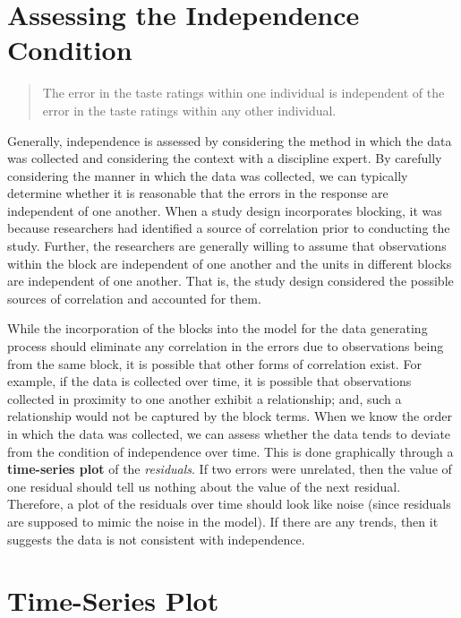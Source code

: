 \documentclass[
  letterpaper,
  DIV=11,
  numbers=noendperiod]{scrreprt}
\theoremstyle{plain}
\theoremstyle{definition}
\theoremstyle{definition}
\theoremstyle{remark}
\begin{document}
\hypertarget{assessing-the-independence-condition-2}{%
\section{Assessing the Independence
Condition}\label{assessing-the-independence-condition-2}}

\begin{quote}
The error in the taste ratings within one individual is independent of
the error in the taste ratings within any other individual.
\end{quote}

Generally, independence is assessed by considering the method in which
the data was collected and considering the context with a discipline
expert. By carefully considering the manner in which the data was
collected, we can typically determine whether it is reasonable that the
errors in the response are independent of one another. When a study
design incorporates blocking, it was because researchers had identified
a source of correlation prior to conducting the study. Further, the
researchers are generally willing to assume that observations within the
block are independent of one another and the units in different blocks
are independent of one another. That is, the study design considered the
possible sources of correlation and accounted for them.

While the incorporation of the blocks into the model for the data
generating process should eliminate any correlation in the errors due to
observations being from the same block, it is possible that other forms
of correlation exist. For example, if the data is collected over time,
it is possible that observations collected in proximity to one another
exhibit a relationship; and, such a relationship would not be captured
by the block terms. When we know the order in which the data was
collected, we can assess whether the data tends to deviate from the
condition of independence over time. This is done graphically through a
\textbf{time-series plot} of the \emph{residuals}. If two errors were
unrelated, then the value of one residual should tell us nothing about
the value of the next residual. Therefore, a plot of the residuals over
time should look like noise (since residuals are supposed to mimic the
noise in the model). If there are any trends, then it suggests the data
is not consistent with independence.

\hypertarget{time-series-plot-2}{%
\section{Time-Series Plot}\label{time-series-plot-2}}
\end{document}
